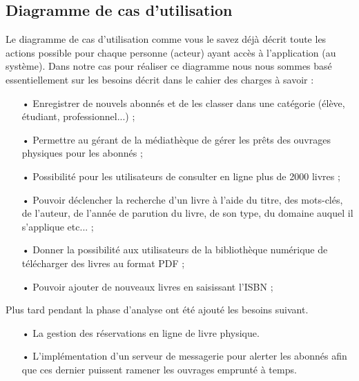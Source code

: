 \documentclass[14pt,a4paper]{article}
\begin{document}
\subsection{Diagramme de cas d'utilisation}
Le diagramme de cas d'utilisation comme vous le savez déjà décrit toute les actions
possible pour chaque personne (acteur) ayant accès à l'application (au système). Dans 
notre cas pour réaliser ce diagramme nous nous sommes basé essentiellement sur les besoins décrit dans le cahier des charges à savoir : 
\begin{itemize} 
\item[•] Enregistrer de nouvels abonnés et de les classer dans une catégorie (élève, étudiant, professionnel...) ;
\item[•] Permettre au gérant de la médiathèque de gérer les prêts des ouvrages physiques pour les abonnés ;
\item[•] Possibilité pour les utilisateurs de consulter en ligne plus de 2000 livres ;
\item[•] Pouvoir déclencher la recherche d’un livre à l’aide du titre, des mots-clés, de l’auteur, de l’année
de parution du livre, de son type, du domaine auquel il s’applique etc... ;
\item[•] Donner la possibilité aux utilisateurs de la bibliothèque numérique de télécharger des livres au
format PDF ;
\item[•] Pouvoir ajouter de nouveaux livres en saisissant l’ISBN ;
\end{itemize}
Plus tard pendant la phase d'analyse ont été ajouté les besoins suivant.\\
\begin{itemize}
\item[•] La gestion des réservations en ligne de livre physique.
\item[•] L'implémentation d'un serveur de messagerie pour alerter les abonnés afin
que ces dernier puissent ramener les ouvrages emprunté à temps.
\end{itemize}
\end{document}
